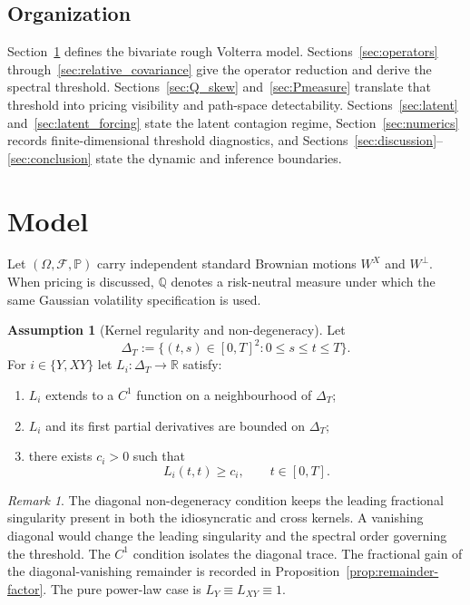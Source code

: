 \documentclass[11pt,a4paper]{amsart}
\theoremstyle{plain}
\theoremstyle{definition}
\newtheorem{assumption}[theorem]{Assumption}
\theoremstyle{remark}
\newtheorem{remark}[theorem]{Remark}
\newcommand{\Q}{\mathbb{Q}}
\newcommand{\PP}{\mathbb{P}}
\newcommand{\R}{\mathbb{R}}
\begin{document}
\subsection*{Organization}
Section~\ref{sec:model} defines the bivariate rough Volterra model.  Sections~\ref{sec:operators}
through~\ref{sec:relative_covariance} give the operator reduction and derive the spectral
threshold.  Sections~\ref{sec:Q_skew} and~\ref{sec:Pmeasure} translate that threshold into pricing
visibility and path-space detectability.  Sections~\ref{sec:latent} and~\ref{sec:latent_forcing}
state the latent contagion regime, Section~\ref{sec:numerics} records finite-dimensional threshold
diagnostics, and Sections~\ref{sec:discussion}--\ref{sec:conclusion} state the dynamic and
inference boundaries.

\section{Model}\label{sec:model}

Let $(\Omega,\mathcal{F},\PP)$ carry independent standard Brownian motions $W^X$ and $W^\perp$.
When pricing is discussed, $\Q$ denotes a risk-neutral measure under which the same Gaussian
volatility specification is used.

\begin{assumption}[Kernel regularity and non-degeneracy]\label{ass:kernels}
Let
\[
\Delta_T:=\{(t,s)\in[0,T]^2:0\le s\le t\le T\}.
\]
For $i\in\{Y,XY\}$ let $L_i:\Delta_T\to\R$ satisfy:
\begin{enumerate}[label=(\roman*)]
\item $L_i$ extends to a $C^1$ function on a neighbourhood of $\Delta_T$;
\item $L_i$ and its first partial derivatives are bounded on $\Delta_T$;
\item there exists $c_i>0$ such that
\[
L_i(t,t)\ge c_i,\qquad t\in[0,T].
\]
\end{enumerate}
\end{assumption}

\begin{remark}
The diagonal non-degeneracy condition keeps the leading fractional singularity present in both the
idiosyncratic and cross kernels.  A vanishing diagonal would change the leading singularity and the
spectral order governing the threshold.  The $C^1$ condition isolates the diagonal trace.  The
fractional gain of the diagonal-vanishing remainder is recorded in
Proposition~\ref{prop:remainder-factor}.  The pure power-law case is
$L_Y\equiv L_{XY}\equiv 1$.
\end{remark}
\end{document}
